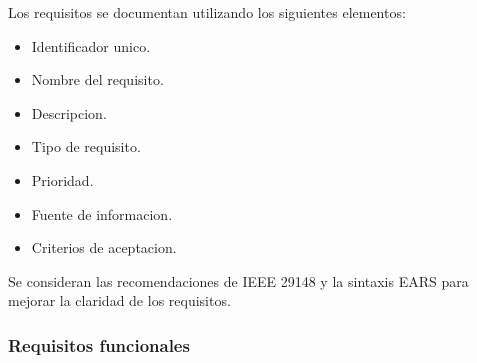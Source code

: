 \documentclass[12pt,a4paper]{article}
\begin{document}
Los requisitos se documentan utilizando los
siguientes elementos:

\begin{itemize}
    \item Identificador unico.
    \item Nombre del requisito.
    \item Descripcion.
    \item Tipo de requisito.
    \item Prioridad.
    \item Fuente de informacion.
    \item Criterios de aceptacion.
\end{itemize}

Se consideran las recomendaciones de IEEE 29148
y la sintaxis EARS para mejorar la claridad
de los requisitos.

\subsubsection{Requisitos funcionales}
\end{document}
